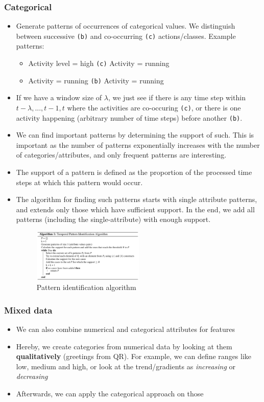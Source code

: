 \subsubsection{Categorical}
\begin{itemize}
	\item Generate patterns of occurrences of categorical values. We distinguish between successive \texttt{(b)} and co-occurring \texttt{(c)} actions/classes. Example patterns:
	\begin{itemize}
		\item Activity level = high \texttt{(c)} Activity = running
		\item Activity = running \texttt{(b)} Activity = running
	\end{itemize}
	\item If we have a window size of $\lambda$, we just see if there is any time step within $t-\lambda, ..., t-1, t$ where the activities are co-occuring \texttt{(c)}, or there is one activity happening (arbitrary number of time steps) before another \texttt{(b)}.
	\item We can find important patterns by determining the support of such. This is important as the number of patterns exponentially increases with the number of categories/attributes, and only frequent patterns are interesting.
	\item The support of a pattern is defined as the proportion of the processed time steps at which this pattern would occur.
	\item The algorithm for finding such patterns starts with single attribute patterns, and extends only those which have sufficient support. In the end, we add all patterns (including the single-attribute) with enough support.
	\begin{figure}[ht!]
		\centering
		\includegraphics[width=0.5\textwidth]{figures/chapter_4_pattern_identification.png}
		\caption{Pattern identification algorithm}
	\end{figure}
\end{itemize}
\subsubsection{Mixed data}
\begin{itemize}
	\item We can also combine numerical and categorical attributes for features
	\item Hereby, we create categories from numerical data by looking at them \textbf{qualitatively} (greetings from QR). For example, we can define ranges like low, medium and high, or look at the trend/gradients as \textit{increasing} or \textit{decreasing}
	\item Afterwards, we can apply the categorical approach on those
\end{itemize}
